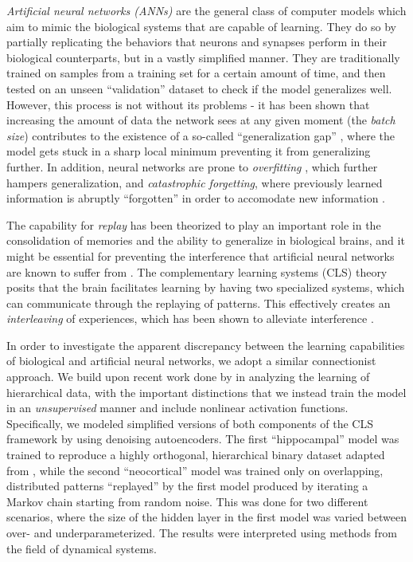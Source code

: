 \documentclass[11pt]{article}
\theoremstyle{remark}
\begin{document}
\textit{Artificial neural networks (ANNs)} are the general class of computer models which aim to mimic the biological systems that are capable of learning. They do so by partially replicating the behaviors that neurons and synapses perform in their biological counterparts, but in a vastly simplified manner. They are traditionally trained on samples from a training set for a certain amount of time, and then tested on an unseen ``validation'' dataset to check if the model generalizes well. However, this process is not without its problems - it has been shown that increasing the amount of data the network sees at any given moment (the \textit{batch size}) contributes to the existence of a so-called ``generalization gap'' \cite{keskar2016on}, where the model gets stuck in a sharp local minimum preventing it from generalizing further. In addition, neural networks are prone to \textit{overfitting} \cite{hawkins2004the}, which further hampers generalization, and \textit{catastrophic forgetting}, where previously learned information is abruptly ``forgotten'' in order to accomodate new information \cite{mccloskey1989catastrophic}.

The capability for \textit{replay} has been theorized to play an important role in the consolidation of memories and the ability to generalize in biological brains, and it might be essential for preventing the interference that artificial neural networks are known to suffer from \cite{genzel2014light}. The complementary learning systems (CLS) theory posits that the brain facilitates learning by having two specialized systems, which can communicate through the replaying of patterns. This effectively creates an \textit{interleaving} of experiences, which has been shown to alleviate interference \cite{mcclelland2020integration}.

In order to investigate the apparent discrepancy between the learning capabilities of biological and artificial neural networks, we adopt a similar connectionist approach. We build upon recent work done by \cite{saxe2019a, mcclelland2020integration} in analyzing the learning of hierarchical data, with the important distinctions that we instead train the model in an \textit{unsupervised} manner and include nonlinear activation functions. Specifically, we modeled simplified versions of both components of the CLS framework by using denoising autoencoders. The first ``hippocampal'' model was trained to reproduce a highly orthogonal, hierarchical binary dataset adapted from \cite{rogers2004semantic}, while the second ``neocortical'' model was trained only on overlapping, distributed patterns ``replayed'' by the first model produced by iterating a Markov chain starting from random noise. This was done for two different scenarios, where the size of the hidden layer in the first model was varied between over- and underparameterized. The results were interpreted using methods from the field of dynamical systems.
\end{document}
